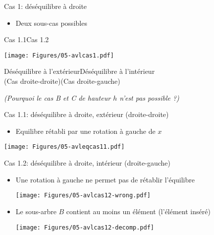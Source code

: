 \begin{frame}{Cas 1: déséquilibre à droite}
\begin{itemize}
\item Deux sous-cas possibles
\end{itemize}

\begin{center}
Cas 1.1\hspace{4cm}Cas 1.2

\medskip

\texttt{[image: Figures/05-avlcas1.pdf]}

\medskip
Déséquilibre à l'extérieur\hspace{1.3cm}Déséquilibre à l'intérieur\\
(Cas droite-droite)\hspace{2cm}(Cas droite-gauche)
\end{center}

\bigskip

\emph{(Pourquoi le cas B et C de hauteur $h$ n'est pas possible ?)}

\end{frame}

\begin{frame}{Cas 1.1: déséquilibre à droite, extérieur (droite-droite)}
\begin{itemize}
\item Equilibre rétabli par une rotation à gauche de $x$
\end{itemize}

\begin{center}
\texttt{[image: Figures/05-avleqcas11.pdf]}
\end{center}

\end{frame}

\begin{frame}{Cas 1.2: déséquilibre à droite, intérieur (droite-gauche)}
\begin{itemize}
\item Une rotation à gauche ne permet pas de rétablir l'équilibre

\begin{center}
\texttt{[image: Figures/05-avlcas12-wrong.pdf]}
\end{center}
\item Le sous-arbre $B$ contient au moins un élément (l'élément inséré)
\begin{center}
\texttt{[image: Figures/05-avlcas12-decomp.pdf]}
\end{center}

\end{itemize}

\end{frame}

